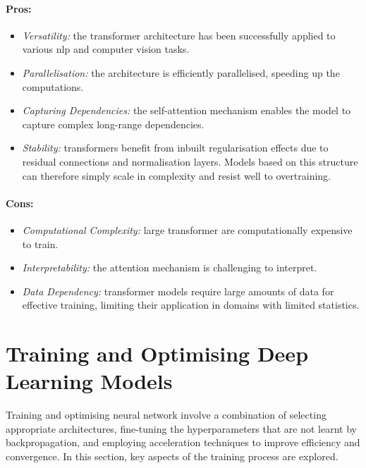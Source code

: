 \paragraph{Pros:}
\begin{itemize}
    \item \textit{Versatility:} the transformer architecture has been successfully applied to various \gls{nlp} and computer vision tasks.
    \item \textit{Parallelisation:} the architecture is efficiently parallelised, speeding up the computations.
    \item \textit{Capturing Dependencies:} the self-attention mechanism enables the model to capture complex long-range dependencies.
    \item \textit{Stability:} transformers benefit from inbuilt regularisation effects due to residual connections and normalisation layers. Models based on this structure can therefore simply scale in complexity and resist well to overtraining.
\end{itemize}

\paragraph{Cons:}
\begin{itemize}
    \item \textit{Computational Complexity:} large transformer are computationally expensive to train.
    \item \textit{Interpretability:} the attention mechanism is challenging to interpret.
    \item \textit{Data Dependency:} transformer models require large amounts of data for effective training, limiting their application in domains with limited statistics.
\end{itemize}

\section{Training and Optimising Deep Learning Models}
Training and optimising neural network involve a combination of selecting appropriate architectures, fine-tuning the hyperparameters that are not learnt by backpropagation, and employing acceleration techniques to improve efficiency and convergence. In this section, key aspects of the training process are explored.

